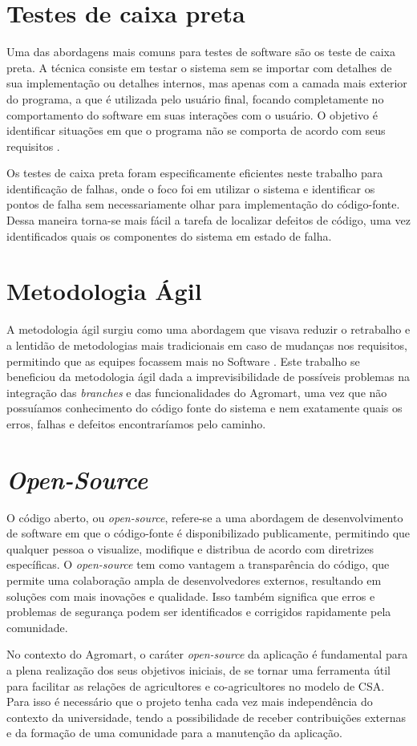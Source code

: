 \section{Testes de caixa preta}
Uma das abordagens mais comuns para testes de software são os teste de caixa preta. A técnica consiste em testar o sistema sem se importar com detalhes de sua implementação ou detalhes internos, mas apenas com a camada mais exterior do programa, a que é utilizada pelo usuário final, focando completamente no comportamento do software em suas interações com o usuário. O objetivo é identificar situações em que o programa não se comporta de acordo com seus requisitos \cite{Myers2012}.

Os testes de caixa preta foram especificamente eficientes neste trabalho para identificação de falhas, onde o foco foi em utilizar o sistema e identificar os pontos de falha sem necessariamente olhar para implementação do código-fonte. Dessa maneira torna-se mais fácil a tarefa de localizar defeitos de código, uma vez identificados quais os componentes do sistema em estado de falha.

\section{Metodologia Ágil}
A metodologia ágil surgiu como uma abordagem que visava reduzir o retrabalho e a lentidão de metodologias mais tradicionais em caso de mudanças nos requisitos, permitindo que as equipes focassem mais no Software \cite{Sommerville2007}.
Este trabalho se beneficiou da metodologia ágil dada a imprevisibilidade de possíveis problemas na integração das \textit{branches} e das funcionalidades do Agromart, uma vez que não possuíamos conhecimento do código fonte do sistema e nem exatamente quais os erros, falhas e defeitos encontraríamos pelo caminho.

\section{\textit{Open-Source}}
O código aberto, ou \textit{open-source}, refere-se a uma abordagem de desenvolvimento de software em que o código-fonte é disponibilizado publicamente, permitindo que qualquer pessoa o visualize, modifique e distribua de acordo com diretrizes específicas.\cite{opensource2023} O \textit{open-source} tem como vantagem a transparência do código, que permite uma colaboração ampla de desenvolvedores externos, resultando em soluções com mais inovações e qualidade. Isso também significa que erros e problemas de segurança podem ser identificados e corrigidos rapidamente pela comunidade. 

No contexto do Agromart, o caráter \textit{open-source} da aplicação é fundamental para a plena realização dos seus objetivos iniciais, de se tornar uma ferramenta útil para facilitar as relações de agricultores e co-agricultores no modelo de CSA. Para isso é necessário que o projeto tenha cada vez mais independência do contexto da universidade, tendo a possibilidade de receber contribuições externas e da formação de uma comunidade para a manutenção da aplicação.